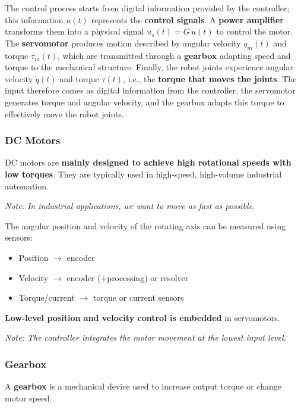 The control process starts from digital information provided by the controller; this information $u(t)$ represents the \textbf{control signals}. A \textbf{power amplifier} transforms them into a physical signal $u_s(t)=G\,u(t)$ to control the motor. The \textbf{servomotor} produces motion described by angular velocity $\dot{q}_m(t)$ and torque $\tau_m(t)$, which are transmitted through a \textbf{gearbox} adapting speed and torque to the mechanical structure. Finally, the robot joints experience angular velocity $\dot{q}(t)$ and torque $\tau(t)$, i.e., the \textbf{torque that moves the joints}. The input therefore comes as digital information from the controller, the servomotor generates torque and angular velocity, and the gearbox adapts this torque to effectively move the robot joints.

\hfill

\subsubsection*{DC Motors}

DC motors are \textbf{mainly designed to achieve high rotational speeds with low torques}.  
They are typically used in high-speed, high-volume industrial automation.  

\textit{Note: In industrial applications, we want to move as fast as possible.}

The angular position and velocity of the rotating axis can be measured using sensors:
\begin{itemize}
    \item Position $\rightarrow$ encoder
    \item Velocity $\rightarrow$ encoder (+processing) or resolver
    \item Torque/current $\rightarrow$ torque or current sensors
\end{itemize}

\textbf{Low-level position and velocity control is embedded} in servomotors.  

\textit{Note: The controller integrates the motor movement at the lowest input level.}

\hfill

\subsubsection*{Gearbox}

A \textbf{gearbox} is a mechanical device used to increase output torque or change motor speed.  

